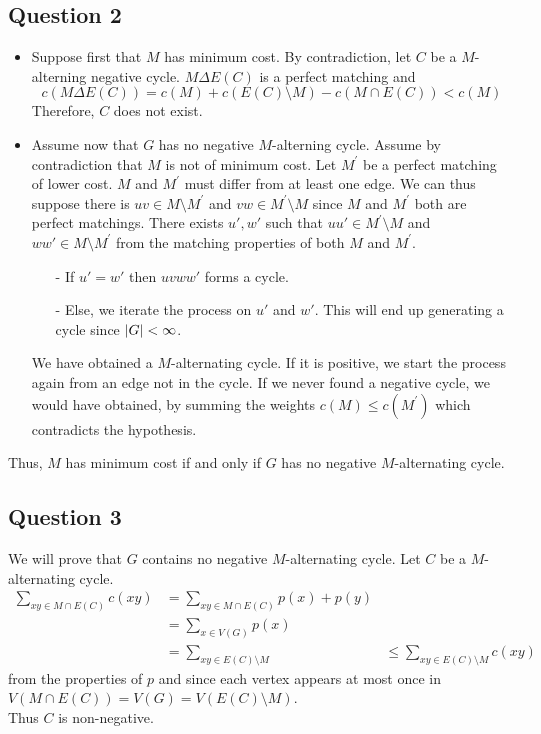 \documentclass{cours}
\begin{document}
\subsection{Question 2}
\begin{itemize}
    \item Suppose first that $M$ has minimum cost. By contradiction, let $C$ be a $M$-alterning negative cycle. $M \Delta E(C)$ is a perfect matching and 
    \[
        c(M\Delta E(C)) = c(M) + c(E(C) \setminus M) - c(M \cap E(C)) < c (M)
    \]
    Therefore, $C$ does not exist. 
    \item Assume now that $G$ has no negative $M$-alterning cycle. Assume by contradiction that $M$ is not of minimum cost. Let $M^{'}$ be a perfect matching of lower cost. $M$ and $M^{'}$ must differ from at least one edge. We can thus suppose there is $uv \in M \setminus M^{'}$ and $vw \in M^{'}\setminus M$ since $M$ and $M^{'}$ both are perfect matchings. There exists $u', w'$ such that $uu' \in M^{'}\setminus M$ and $ww' \in M\setminus M^{'}$ from the matching properties of both $M$ and $M^{'}$.
    \begin{itemize}
        \item[-] If $u' = w'$ then $uvww'$ forms a cycle.
        \item[-] Else, we iterate the process on $u'$ and $w'$. This will end up generating a cycle since $\left|G\right| < \infty$. 
    \end{itemize}
    We have obtained a $M$-alternating cycle. If it is positive, we start the process again from an edge not in the cycle. If we never found a negative cycle, we would have obtained, by summing the weights $c(M) \leq c(M^{'})$ which contradicts the hypothesis. 
\end{itemize}
Thus, $M$ has minimum cost if and only if $G$ has no negative $M$-alternating cycle. 

\subsection{Question 3}
We will prove that $G$ contains no negative $M$-alternating cycle. Let $C$ be a $M$-alternating cycle. 
\[  
    \begin{aligned}
        \sum_{xy \in M\cap E(C)} c(xy) &= \sum_{xy \in M \cap E(C)} p(x) + p(y)\\
        & = \sum_{x \in V(G)} p(x)\\
        & = \sum_{xy \in E(C)\setminus M}
        & \leq \sum_{xy \in E(C) \setminus M} c(xy)
    \end{aligned}
\]
from the properties of $p$ and since each vertex appears at most once in $V(M\cap E(C)) = V(G) = V(E(C) \setminus M)$.\\
Thus $C$ is non-negative. 
\end{document}
